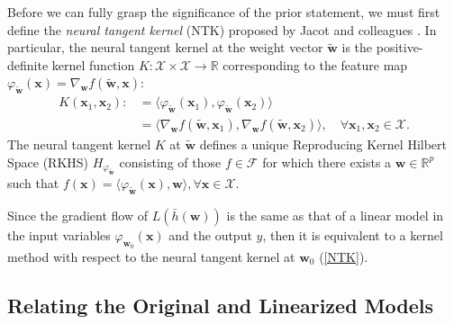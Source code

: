 \documentclass{article}
\DeclareMathOperator*{\argmin}{arg\,min}
\begin{document}
Before we can fully grasp the significance of the prior statement, we must first define the \textit{neural tangent kernel} (NTK) proposed by Jacot and colleagues \cite{jacot2018neural}. In particular, the neural tangent kernel at the weight vector $\boldsymbol{\tilde{w}}$ is the positive-definite kernel function $K: \mathcal{X} \times \mathcal{X} \rightarrow \mathbb{R}$ corresponding to the feature map $\varphi_{\boldsymbol{\tilde{w}}}(\boldsymbol{x}) = \nabla_{\boldsymbol{w}} f(\boldsymbol{\tilde{w}}, \boldsymbol{x})$:
\begin{align}
    K(\boldsymbol{x}_1, \boldsymbol{x}_2) :&= \langle \varphi_{\boldsymbol{\tilde{w}}}(\boldsymbol{x}_1), \varphi_{\boldsymbol{\tilde{w}}}(\boldsymbol{x}_2) \rangle \nonumber \\
    &= \langle \nabla_{\boldsymbol{w}} f(\boldsymbol{\tilde{w}}, \boldsymbol{x}_1), \nabla_{\boldsymbol{w}} f(\boldsymbol{\tilde{w}}, \boldsymbol{x}_2) \rangle, \quad \forall \boldsymbol{x}_1, \boldsymbol{x}_2 \in \mathcal{X}\label{NTK}.
\end{align}
The neural tangent kernel $K$ at $\boldsymbol{\tilde{w}}$ defines a unique Reproducing Kernel Hilbert Space (RKHS) $H_{\varphi_{\boldsymbol{\tilde{w}}}}$ consisting of those $f \in \mathcal{F}$ for which there exists a $\boldsymbol{w} \in \mathbb{R}^p$ such that $f(\boldsymbol{x}) = \langle \varphi_{\boldsymbol{\tilde{w}}}(\boldsymbol{x}), \boldsymbol{w} \rangle, \forall \boldsymbol{x} \in \mathcal{X}$.  

Since the gradient flow of $L(\bar{h}(\boldsymbol{w}))$ is the same as that of a linear model in the input variables $\varphi_{\boldsymbol{w}_0}(\boldsymbol{x})$ and the output $y$, then it is equivalent to a kernel method with respect to the neural tangent kernel at $\boldsymbol{w}_0$ (\ref{NTK}). 


\subsection{Relating the Original and Linearized Models}\label{kerneltheory}
\end{document}
